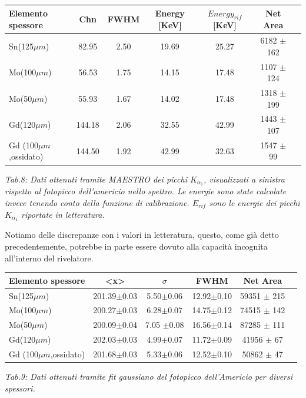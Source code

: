\documentclass[a4paper]{article}
\begin{document}
\begin{center} 
		
		\begin{tabular}{lcccccc}
			\hline
			\hline
			\textbf{Elemento spessore} & \textbf{Chn}  &   \textbf{FWHM} & \textbf{Energy} [KeV] & \textbf{$Energy_{rif}$} [KeV]  & \textbf{Net Area}	\\
			\hline
			\hline
				      Sn(125$\mu m$) &  82.95   & 2.50 & 19.69	& 25.27 & 6182	$\pm$	162	\\
				      Mo(100$\mu m$) &  56.53   & 1.75 	& 14.15 & 17.48 & 1107	$\pm$	124 \\
				      Mo(50$\mu m$) &  55.93	& 1.67	& 14.02	& 17.48 & 1318		$\pm$	199 \\
				      Gd(120$\mu m$) &  144.18	& 2.06 	& 32.55	& 42.99 & 1443	$\pm$	107 \\
				      Gd (100$\mu m$,ossidato) &  144.50 & 1.92 & 42.99 & 32.63	&  1547	$\pm$	99 \\
				      
			\hline
			\hline
		\end{tabular}
		\linebreak
		\emph{Tab.8: Dati ottenuti tramite MAESTRO dei picchi $K_{\alpha_{1}}$, visualizzati a sinistra rispetto al fotopicco dell'americio nello spettro. Le energie sono state calcolate invece tenendo conto della funzione di calibrazione. $E_{rif}$ sono le energie dei picchi $K_{\alpha_{1}}$ riportate in letteratura.} 
	\end{center}
Notiamo delle discrepanze con i valori in letteratura, questo, come già detto precedentemente, potrebbe in parte essere dovuto alla capacità incognita all'interno del rivelatore.	

\begin{center} 
		
		\begin{tabular}{lccccc}
			\hline
			\hline
			\textbf{Elemento spessore} & \textbf{<x>}  &   \textbf{$\sigma$} &\textbf{FWHM}  & \textbf{Net Area}	\\
			\hline
			\hline
				      Sn(125$\mu m$) &  201.39$\pm$0.03   & 5.50$\pm$0.06  & 12.92$\pm$0.10   &  59351	$\pm$	215	\\
				      Mo(100$\mu m$) &  200.27$\pm$0.03   & 6.28$\pm$0.07 & 14.75$\pm$0.12	&  74515	$\pm$	142 \\
				      Mo(50$\mu m$) &  200.09$\pm$0.04	& 7.05	$\pm$0.08 & 16.56$\pm$0.14 &  87285		$\pm$	111 \\
				      Gd(120$\mu m$) &  202.03$\pm$0.03	& 4.99$\pm$0.07	 & 11.72$\pm$0.09  &  41956	$\pm$	67 \\
				      Gd (100$\mu m$,ossidato) &  201.68$\pm$0.03& 5.33$\pm$0.06 & 12.52$\pm$0.10	&  50862	$\pm$	47 \\
				      
			\hline
			\hline
		\end{tabular}
		\linebreak
		\emph{Tab.9: Dati ottenuti tramite fit gaussiano del fotopicco dell'Americio per diversi spessori.} 
\end{center}
\end{document}
